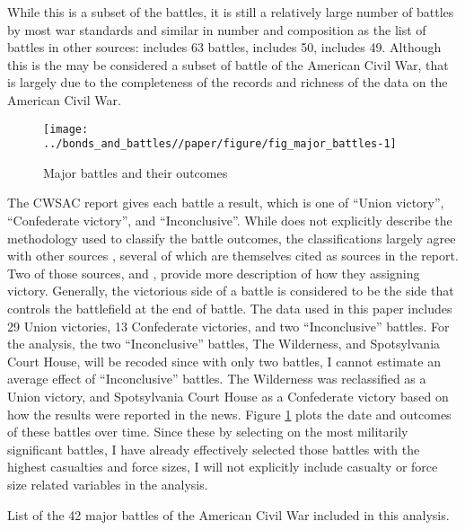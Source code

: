 While this is a subset of the battles, it is still a relatively large number of battles by most war standards and similar in number and composition as the list of battles in other sources: \textcite{Livermore1900} includes 63 battles, \textcite{Bodart1908} includes 50, \textcite{cdb90} includes 49.
Although this is the may be considered a subset of battle of the American Civil War, that is largely due to the completeness of the records and richness of the data on the American Civil War.

\begin{figure}[htpb]
  \centering
  \texttt{[image: ../bonds\_and\_battles//paper/figure/fig\_major\_battles-1]}
  \caption{Major battles and their outcomes}
  \label{bonds_battles:fig:major_battles}
\end{figure}

The CWSAC report \parencite{CWSAC1993b} gives each battle a result, which is one of ``Union victory'', ``Confederate victory'', and ``Inconclusive''.
While \textcite{CWSAC1993} does not explicitly describe the methodology used to classify the battle outcomes, the classifications largely agree with other sources \parencites{fox1898regimental}{Livermore1900}{Bodart1908}{cdb90}, several of which are themselves cited as sources in the report.
Two of those sources, \textcite{fox1898regimental} and \textcite{Livermore1900}, provide more description of how they assigning victory.
Generally, the victorious side of a battle is considered to be the side that controls the battlefield at the end of battle.
The data used in this paper includes 29 Union victories, 13 Confederate victories, and two ``Inconclusive'' battles.
For the analysis, the two ``Inconclusive'' battles,  The Wilderness, and Spotsylvania Court House, will be recoded since with only two battles, I cannot estimate an average effect of ``Inconclusive'' battles.
The Wilderness was reclassified as a Union victory, and Spotsylvania Court House as a Confederate victory based on how the results were reported in the news.
Figure \ref{bonds_battles:fig:major_battles} plots the date and outcomes of these battles over time.%
Since these by selecting on the most militarily significant battles, I have already effectively selected those battles with the highest casualties and force sizes, I will not explicitly include casualty or force size related variables in the analysis.

\begin{table}
  \centering
  
  \caption{List of the 42 major battles of the American Civil War included in this analysis.}
  \label{bonds_battles:tab:battles}
\end{table}

